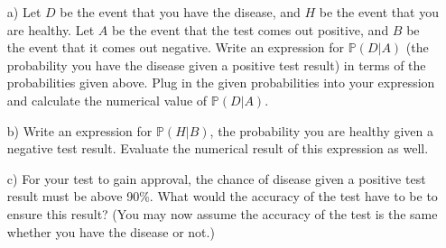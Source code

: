 \documentclass[]{article}
\newif\ifsolutions
\renewcommand{\answer}[1]{{\color{mydarkblue}\textbf{Solution:}#1}}
\begin{document}
\begin{qunlist}
\begin{enumerate}
\qpart 
\item[a)] Let $D$ be the event that you have the disease, and $H$ be the event that you are healthy.  Let $A$ be the event that the test comes out positive, and $B$ be the event that it comes out negative.  Write an expression for $\mathbb{P}(D|A)$ (the probability you have the disease given a positive test result) in terms of the probabilities given above.  Plug in the given probabilities into your expression and calculate the numerical value of $\mathbb{P}(D|A)$.

\ifsolutions{ \answer { We know from Bayes rule that
\[ P(D|A) = \frac{P(D)P(A|D)}{P(A)}. \]

We know that $P(D) = 0.001$ and $P(A|D) = 0.95$, but it is unclear how to compute $P(A)$. However, we do know that the probability of a positive test result should be the probability of a positive test result and disease, plus the probability of a positive test result and healthy. This gives us
\[ P(A) = P(A,D) + P(A,H) = P(D)P(A|D) + P(H)P(A|H). \]

which we have expanded above using Bayes rule.  Now we have $P(A)$ in term of quantities we know, and can write
\[ P(D|A) = \frac{P(D)P(A|D)}{P(D)P(A|D) + P(H)P(A|H)} = \frac{0.001 \cdot 0.95}{0.001 \cdot 0.95+ 0.999 \cdot 0.15} = 0.62997\%, \]

so even given a positive test result, we get a very very small probability of disease.
}}\fi

\qpart
\item[b)] Write an expression for $\mathbb{P}(H|B)$, the probability you are healthy given a negative test result.  Evaluate the numerical result of this expression as well.

\ifsolutions{ \answer { Similarly, we get
\[ P(H|B) = \frac{P(H)P(B|H)}{P(B)} = \frac{P(H)P(B|H)}{P(H)P(B|H) + P(D)P(B|D)} = \frac{0.999 \cdot 0.85}{0.999 \cdot 0.85 + 0.001 \cdot 0.05} = 99.9941\%. \]
}}\fi

\qpart
\item[c)] For your test to gain approval, the chance of disease given a positive test result must be above 90\%. What would the accuracy of the test have to be to ensure this result?  (You may now assume the accuracy of the test is the same whether you have the disease or not.)

\ifsolutions{ \answer {
Solve for $x$:
\[ P(D|A) = \frac{0.001 \cdot x}{0.001 \cdot x + 0.999 \cdot (1-x)} = 0.9 \quad \Rightarrow \quad x = 99.9889\% \]
}}\fi


\end{enumerate}
\end{qunlist}
\end{document}
